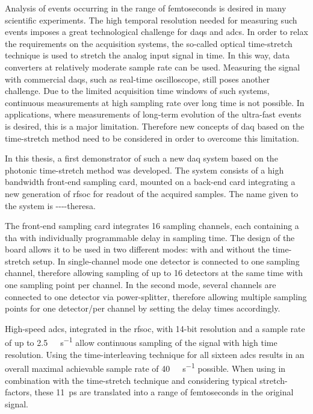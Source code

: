 Analysis of events occurring in the range of femtoseconds is desired in many scientific experiments.
The high temporal resolution needed for measuring such events imposes a great technological challenge for \glspl{daq} and \glspl{adc}.
In order to relax the requirements on the acquisition systems, the so-called optical time-stretch technique is used to stretch the analog input signal in time.
In this way, data converters at relatively moderate sample rate can be used.
Measuring the signal with commercial \glspl{daq}, such as real-time oscilloscope, still poses another challenge.
Due to the limited acquisition time windows of such systems, continuous measurements at high sampling rate over long time is not possible.
In applications, where measurements of long-term evolution of the ultra-fast events is desired, this is a major limitation.
Therefore new concepts of \gls{daq} based on the time-stretch method need to be considered in order to overcome this limitation. 

In this thesis, a first demonstrator of such a new \gls{daq} system based on the photonic time-stretch method was developed.
The system consists of a high bandwidth front-end sampling card, mounted on a back-end card integrating a new generation of \gls{rfsoc} for readout of the acquired samples. The name given to the system is \gls{----theresa}.

The front-end sampling card integrates 16 sampling channels, each containing a \gls{tha} with individually programmable delay in sampling time. 
The design of the board allows it to be used in two different modes: with and without the time-stretch setup.
In single-channel mode one detector is connected to one sampling channel, therefore allowing sampling of up to 16 detectors at the same time with one sampling point per channel.
In the second mode, several channels are connected to one detector via power-splitter, therefore allowing multiple sampling points for one detector/per channel by setting the delay times accordingly. 

High-speed \glspl{adc}, integrated in the \gls{rfsoc}, with 14-bit resolution and a sample rate of up to \SI{2.5}{\giga \sample\per\second} allow continuous sampling of the signal with high time resolution. 
Using the time-interleaving technique for all sixteen \glspl{adc} results in an overall maximal achievable sample rate of \SI{40}{\giga\sample\per\second} possible.  
When using in combination with the time-stretch technique and considering typical stretch-factors, these \SI{11}{\pico \second} are translated into a range of femtoseconds in the original signal.

